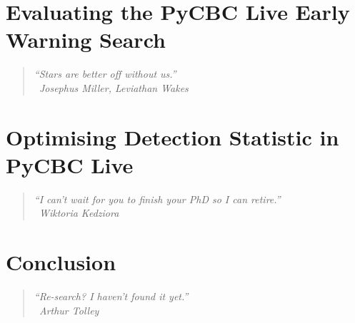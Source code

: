 \documentclass[12pt,twoside]{report} %
\makeatletter
\newcommand{\chapterquote}[2]{
  \begin{quote}
    \color{mediumgray}\itshape #1 \\[1ex] %
    \raggedleft %
    \textemdash\ #2
  \end{quote}
}
\renewcommand{\cleardoublepage}{%
  \clearpage%
  \if@twoside
    \ifodd\c@page
    \else
      \hbox{}%
      \thispagestyle{empty}%
      \newpage
    \fi
  \fi
}
\let\oldchapter\chapter
\renewcommand{\chapter}{\cleardoublepage\oldchapter}
\makeatother
\begin{document}
\chapter[Evaluating the PyCBC Live Early Warning Search]{\label{chapter:6-earlywarning}Evaluating the PyCBC Live Early Warning Search}
\chapterquote{``Stars are better off without us.''}{Josephus Miller, Leviathan Wakes}


\chapter[Optimising Detection Statistic in PyCBC Live]{\label{chaper:7-snr-optimizer}Optimising Detection Statistic in PyCBC Live}
\chapterquote{``I can't wait for you to finish your PhD so I can retire.''}{Wiktoria Kedziora}


% 

\chapter[Conclusion]{\label{chapter:conclusion}Conclusion}
\chapterquote{``Re-search? I haven't found it yet.''}{Arthur Tolley}



% 
% 
\nocite{*}
\printbibliography
\end{document}
